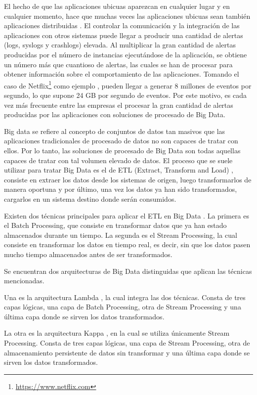 El hecho de que las aplicaciones ubicuas aparezcan en cualquier lugar y en cualquier momento, hace que muchas veces las aplicaciones ubicuas sean también aplicaciones distribuidas \cite{Tfg:distributedapp}. El controlar la comunicación y la integración de las aplicaciones con otros sistemas puede llegar a producir una cantidad de alertas (logs, syslogs y crashlogs) elevada. Al multiplicar la gran cantidad de alertas producidas por el número de instancias ejecutándose de la aplicación, se obtiene un número más que cuantioso de alertas, las cuales se han de procesar para obtener información sobre el comportamiento de las aplicaciones. Tomando el caso de Netflix\footnote{\href{https://www.netflix.com}{https://www.netflix.com}} como ejemplo \cite{Tfg:netflixpipe}, pueden llegar a generar 8 millones de eventos por segundo, lo que supone 24 GB por segundo de eventos. Por este motivo, es cada vez más frecuente entre las empresas el procesar la gran cantidad de alertas producidas por las aplicaciones con soluciones de procesado de Big Data.

Big data \cite{Tfg:bigdata} se refiere al concepto de conjuntos de datos tan masivos que las aplicaciones tradicionales de procesado de datos no son capaces de tratar con ellos. Por lo tanto, las soluciones de procesado de Big Data son todas aquellas capaces de tratar con tal volumen elevado de datos. El proceso que se suele utilizar para tratar Big Data es el de ETL (Extract, Transform and Load) \cite{Tfg:etl}, consiste en extraer los datos desde los sistemas de origen, luego transformarlos de manera oportuna y por último, una vez los datos ya han sido transformados, cargarlos en un sistema destino donde serán consumidos. 

Existen dos técnicas principales para aplicar el ETL en Big Data \cite{Tfg:batchstream}. La primera es el Batch Processing, que consiste en transformar datos que ya han estado almacenados durante un tiempo. La segunda es el Stream Processing, la cual consiste en transformar los datos en tiempo real, es decir, sin que los datos pasen mucho tiempo almacenados antes de ser transformados. 

Se encuentran dos arquitecturas de Big Data distinguidas que aplican las técnicas mencionadas. 

Una es la arquitectura Lambda \cite{Tfg:lambda}, la cual integra las dos técnicas. Consta de tres capas lógicas, una capa de Batch Processing, otra de Stream Processing y una última capa donde se sirven los datos transformados.

La otra es la arquitectura Kappa \cite{Tfg:kappa}, en la cual se utiliza únicamente Stream Processing. Consta de tres capas lógicas, una capa de Stream Processing, otra de almacenamiento persistente de datos sin transformar y una última capa donde se sirven los datos transformados.

